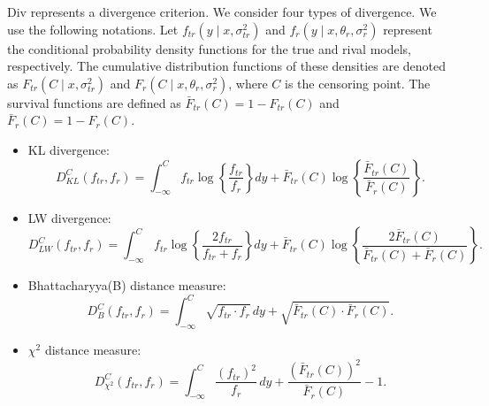 \documentclass[12pt, a4paper]{article}
\begin{document}
\(\text{Div}\) represents a divergence criterion. We consider four types of divergence. We use the following notations. Let \( f_{tr}(y \mid x, \sigma^2_{tr}) \) and \( f_r(y \mid x, \theta_r, \sigma^2_r) \) represent the conditional probability density functions for the true and rival models, respectively. The cumulative distribution functions of these densities are denoted as \( F_{tr}(C \mid x, \sigma^2_{tr}) \) and \( F_r(C \mid x, \theta_r, \sigma^2_r) \), where \( C \) is the censoring point. The survival functions are defined as \( \bar{F}_{tr}(C) = 1 - F_{tr}(C) \) and \( \bar{F}_r(C) = 1 - F_r(C) \).

\begin{itemize}
\item KL divergence:
$$
D_{KL}^C(f_{tr}, f_r) = \int_{-\infty}^C f_{tr} \log \left\{ \frac{f_{tr}}{f_r} \right\} dy + \bar{F}_{tr}(C) \log \left\{ \frac{\bar{F}_{tr}(C)}{\bar{F}_r(C)} \right\}.
$$
\item LW divergence:
$$
D_{LW}^C(f_{tr}, f_r) = \int_{-\infty}^C f_{tr} \log \left\{ \frac{2f_{tr}}{f_{tr} + f_r} \right\} dy + \bar{F}_{tr}(C) \log \left\{ \frac{2\bar{F}_{tr}(C)}{ \bar{F}_{tr}(C) + \bar{F}_r(C)} \right\}.
$$
\item Bhattacharyya(B) distance measure:
$$
D_B^C(f_{tr}, f_r) = \int_{-\infty}^C \sqrt{f_{tr} \cdot f_r} \, dy + \sqrt{\bar{F}_{tr}(C) \cdot \bar{F}_r(C)}.
$$
\item $\chi^2$ distance measure:
$$
D_{\chi^2}^C(f_{tr}, f_r) = \int_{-\infty}^C \frac{(f_{tr})^2}{f_r} \, dy + \frac{\left(\bar{F}_{tr}(C)\right)^2}{\bar{F}_r(C)} - 1.
$$
\end{itemize}
\end{document}
